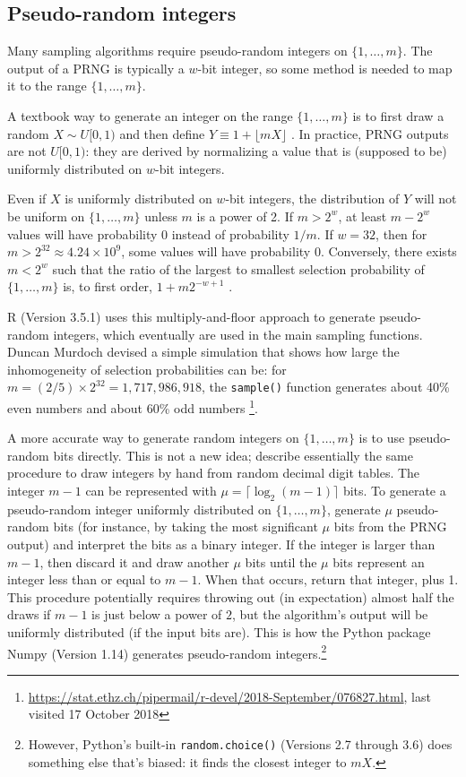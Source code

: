 \documentclass[graybox]{svmult}
\begin{document}
\subsection{Pseudo-random integers}
\label{sec:integers}
Many sampling algorithms require pseudo-random integers on $\{1, \ldots, m\}$.
The output of a PRNG is typically a $w$-bit integer, so some method is needed to map it to the range $\{1, \ldots, m\}$.

A textbook way to generate an integer on the range $\{1, \ldots, m\}$ is to first draw a random $X \sim U[0,1)$
and then define $Y \equiv 1 + \lfloor mX \rfloor$ \cite{press_numerical_1988, peck_introduction_2011}. 
In practice, PRNG outputs are not $U[0,1)$: they are derived by normalizing a value that is
 (supposed to be) uniformly distributed on $w$-bit integers. 

Even if $X$ is uniformly distributed on $w$-bit integers, the distribution of $Y$ will not be uniform on $\{1, \ldots, m\}$ unless $m$ is a power of 2.
If $m > 2^w$, at least $m-2^w$ values will have probability 0 instead of probability $1/m$.
If $w=32$, then for $m>2^{32}\approx4.24 \times 10^9$, some values will have probability 0. 
Conversely, there exists $m < 2^w$ such that the ratio of the largest to smallest selection probability
of $\{1, \ldots, m\}$ is, to first order,  $1+ m 2^{-w+1}$ \cite{knuth_art_1997}.

R (Version 3.5.1) \cite{R_2018} uses this multiply-and-floor approach to generate 
pseudo-random integers,
which eventually are used in the main sampling functions.
Duncan Murdoch devised a simple simulation that shows how large the inhomogeneity of selection
probabilities can be:
for $m=  (2/5) \times 2^{32} = 1,717,986,918$, the \texttt{sample()} function generates about 40\% even numbers and about 60\% odd numbers \footnote{ %
\url{https://stat.ethz.ch/pipermail/r-devel/2018-September/076827.html}, last visited 17 October 2018
}. %
    
A more accurate way to generate random integers on $\{1, \dots, m\}$ is to use pseudo-random bits directly. 
This is not a new idea; \cite{hodges_basic_1970} describe essentially the same procedure to draw integers by hand
from random decimal digit tables.
The integer $m-1$ can be represented with $\mu = \lceil \log_2(m-1) \rceil$ bits. 
To generate a pseudo-random integer uniformly distributed on $\{1, \ldots, m\}$, 
generate $\mu$ pseudo-random bits (for instance, by taking the most significant $\mu$ bits from the PRNG output) and interpret the bits as a binary integer.  
If the integer is larger than $m-1$, then discard it and draw another $\mu$ bits until the $\mu$ bits represent an integer less than or equal to $m-1$.
When that occurs, return that integer, plus 1.
This procedure potentially requires throwing out (in expectation) almost half the draws if $m-1$ is 
just below a power of $2$, but the algorithm's output will be uniformly distributed (if the input bits are).
This is how the Python package Numpy (Version 1.14) generates pseudo-random integers.\footnote{
However, Python's built-in \texttt{random.choice()} (Versions 2.7 through 3.6) does something else that's biased: it finds the closest integer to $mX$.
}
\end{document}
